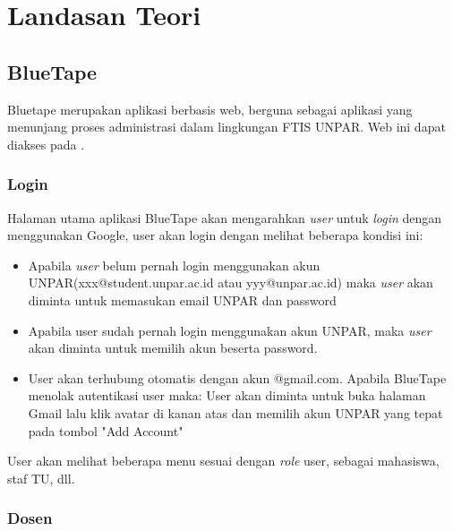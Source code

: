 \chapter{Landasan Teori}
\label{chap:teori}

\section{BlueTape}
Bluetape merupakan aplikasi berbasis web, berguna sebagai aplikasi yang menunjang proses administrasi dalam lingkungan FTIS UNPAR. Web ini dapat diakses pada . \cite{blueTape}

\subsection{Login}
Halaman utama aplikasi BlueTape akan mengarahkan \textit{user} untuk \textit{login} dengan menggunakan Google, user akan login dengan melihat beberapa kondisi ini:
\begin{itemize}
\item Apabila \textit{user} belum pernah login menggunakan akun UNPAR(xxx@student.unpar.ac.id atau yyy@unpar.ac.id) maka  \textit{user} akan diminta untuk memasukan email UNPAR dan password
\item Apabila user sudah pernah login menggunakan akun UNPAR, maka \textit{user} akan diminta untuk memilih akun beserta password.
\item User akan terhubung otomatis dengan akun @gmail.com. Apabila BlueTape menolak autentikasi user maka: User akan diminta untuk buka halaman Gmail lalu klik avatar di kanan atas dan memilih akun UNPAR yang tepat pada tombol "Add Account"
\end{itemize}
User akan melihat beberapa menu sesuai dengan \textit{role} user, sebagai mahasiswa, staf TU, dll.

\subsection{Dosen}
